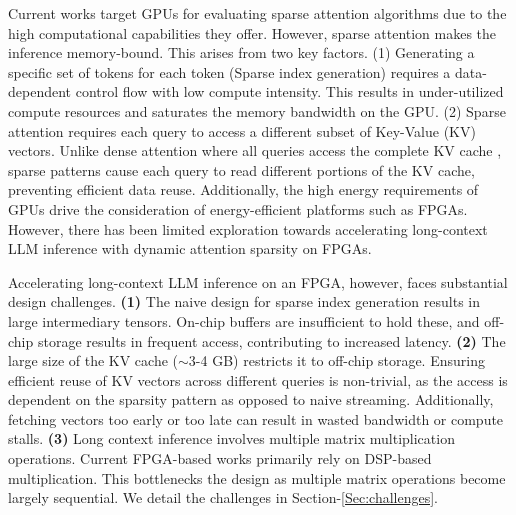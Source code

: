 \documentclass[conference]{IEEEtran}
\begin{document}
Current works target GPUs for evaluating sparse attention algorithms due to the high computational capabilities they offer. However, sparse attention makes the inference memory-bound. This arises from two key factors. (1) Generating a specific set of tokens for each token (Sparse index generation) requires a data-dependent control flow with low compute intensity. This results in under-utilized compute resources and saturates the memory bandwidth on the GPU. 
(2) Sparse attention requires each query to access a different subset of Key-Value (KV) vectors. Unlike dense attention where all queries access the complete KV cache \cite{pope2022efficientlyscalingtransformerinference}, sparse patterns cause each query to read different portions of the KV cache, preventing efficient data reuse.
Additionally, the high energy requirements of GPUs drive the consideration of energy-efficient platforms such as FPGAs. However, there has been limited exploration towards accelerating long-context LLM inference with dynamic attention sparsity on FPGAs.

Accelerating long-context LLM inference on an FPGA, however, faces substantial design challenges. \textbf{(1)} The naive design for sparse index generation results in large intermediary tensors. On-chip buffers are insufficient to hold these, and off-chip storage results in frequent access, contributing to increased latency. \textbf{(2)} The large size of the KV cache ($\sim$3-4 GB) restricts it to off-chip storage. Ensuring efficient reuse of KV vectors across different queries is non-trivial, as the access is dependent on the sparsity pattern as opposed to naive streaming. Additionally, fetching vectors too early or too late can result in wasted bandwidth or compute stalls. \textbf{(3)} Long context inference involves multiple matrix multiplication operations. Current FPGA-based works \cite{flightllm, flightvgm} primarily rely on DSP-based multiplication. This bottlenecks the design as multiple matrix operations become largely sequential. We detail the challenges in Section-\ref{Sec:challenges}. 
\end{document}

